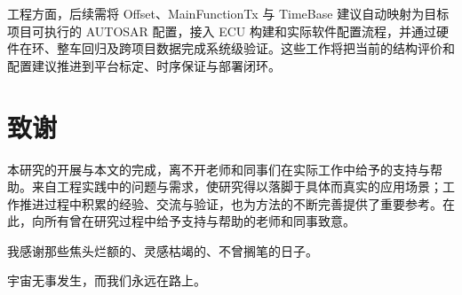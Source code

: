 \documentclass[UTF8,a4paper,twoside,zihao=-4]{ctexart}
\numberwithin{equation}{section}
\numberwithin{figure}{section}
\numberwithin{table}{section}
\theoremstyle{definition}
\numberwithin{algocf}{section}
\begin{document}
工程方面，后续需将 Offset、MainFunctionTx 与 TimeBase 建议自动映射为目标项目可执行的 AUTOSAR 配置，接入 ECU 构建和实际软件配置流程，并通过硬件在环、整车回归及跨项目数据完成系统级验证。这些工作将把当前的结构评价和配置建议推进到平台标定、时序保证与部署闭环。
\clearpage
\section*{致\hspace{2em}谢}
本研究的开展与本文的完成，离不开老师和同事们在实际工作中给予的支持与帮助。来自工程实践中的问题与需求，使研究得以落脚于具体而真实的应用场景；工作推进过程中积累的经验、交流与验证，也为方法的不断完善提供了重要参考。在此，向所有曾在研究过程中给予支持与帮助的老师和同事致意。\par
\vspace{\baselineskip}
我感谢那些焦头烂额的、灵感枯竭的、不曾搁笔的日子。

宇宙无事发生，而我们永远在路上。
\end{document}
